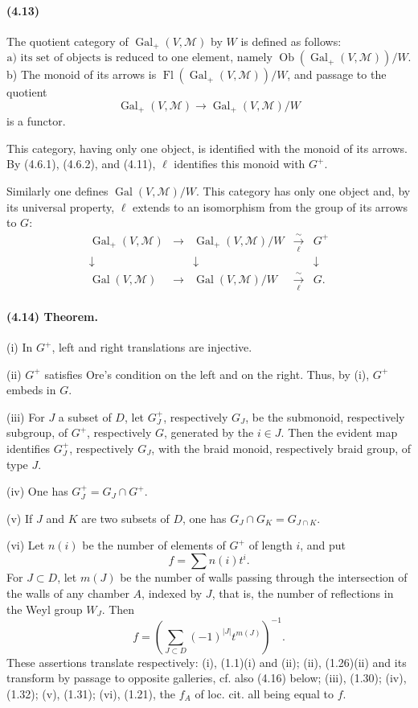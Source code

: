 \documentclass[10pt]{article}
\begin{document}
\paragraph{(4.13)} The quotient category of \(\operatorname{Gal}_+(V,\mathcal M)\) by \(W\) is defined as follows:
\[
\text{a) its set of objects is reduced to one element, namely }
\operatorname{Ob}(\operatorname{Gal}_+(V,\mathcal M))/W.
\]
b) The monoid of its arrows is \(\operatorname{Fl}(\operatorname{Gal}_+(V,\mathcal M))/W\), and passage to the quotient
\[
\operatorname{Gal}_+(V,\mathcal M)\longrightarrow
\operatorname{Gal}_+(V,\mathcal M)/W
\]
is a functor.

This category, having only one object, is identified with the monoid of its arrows. By (4.6.1), (4.6.2), and (4.11), \(\ell\) identifies this monoid with \(G^+\).

Similarly one defines \(\operatorname{Gal}(V,\mathcal M)/W\). This category has only one object and, by its universal property, \(\ell\) extends to an isomorphism from the group of its arrows to \(G\):
\[
\begin{array}{ccccc}
\operatorname{Gal}_+(V,\mathcal M)&\longrightarrow&
\operatorname{Gal}_+(V,\mathcal M)/W&\xrightarrow[\ell]{\sim}&G^+\\
\downarrow&&\downarrow&&\downarrow\\
\operatorname{Gal}(V,\mathcal M)&\longrightarrow&
\operatorname{Gal}(V,\mathcal M)/W&\xrightarrow[\ell]{\sim}&G .
\end{array}
\]

\paragraph{(4.14) Theorem.} (i) In \(G^+\), left and right translations are injective.

(ii) \(G^+\) satisfies Ore's condition on the left and on the right. Thus, by (i), \(G^+\) embeds in \(G\).

(iii) For \(J\) a subset of \(D\), let \(G_J^+\), respectively \(G_J\), be the submonoid, respectively subgroup, of \(G^+\), respectively \(G\), generated by the \(i\in J\). Then the evident map identifies \(G_J^+\), respectively \(G_J\), with the braid monoid, respectively braid group, of type \(J\).

(iv) One has \(G_J^+=G_J\cap G^+\).

(v) If \(J\) and \(K\) are two subsets of \(D\), one has \(G_J\cap G_K=G_{J\cap K}\).

(vi) Let \(n(i)\) be the number of elements of \(G^+\) of length \(i\), and put
\[
f=\sum n(i)t^i.
\]
For \(J\subset D\), let \(m(J)\) be the number of walls passing through the intersection of the walls of any chamber \(A\), indexed by \(J\), that is, the number of reflections in the Weyl group \(W_J\). Then
\[
f=\left(\sum_{J\subset D}(-1)^{|J|}t^{m(J)}\right)^{-1}.
\]
These assertions translate respectively: (i), (1.1)(i) and (ii); (ii), (1.26)(ii) and its transform by passage to opposite galleries, cf. also (4.16) below; (iii), (1.30); (iv), (1.32); (v), (1.31); (vi), (1.21), the \(f_A\) of loc. cit. all being equal to \(f\).
\end{document}

